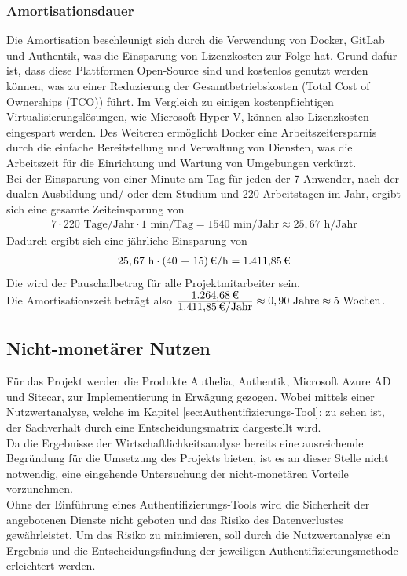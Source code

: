 \subsubsection{Amortisationsdauer}
\label{sec:Amortisationsdauer}
Die Amortisation beschleunigt sich durch die Verwendung von Docker, GitLab und Authentik, was die Einsparung von Lizenzkosten zur Folge hat. 
Grund dafür ist, dass diese Plattformen Open-Source sind und kostenlos genutzt werden können, was zu einer Reduzierung der  
Gesamtbetriebskosten (Total Cost of Ownerships (TCO)) führt. 
Im Vergleich zu einigen kostenpflichtigen Virtualisierungslösungen, wie \zB Microsoft Hyper-V, können also Lizenzkosten eingespart werden. 
Des Weiteren ermöglicht Docker eine Arbeitszeitersparnis durch die einfache Bereitstellung und Verwaltung von Diensten, was die Arbeitszeit für die 
Einrichtung und Wartung von Umgebungen verkürzt.
\\Bei der Einsparung von einer Minute am Tag für jeden der 7 Anwender, nach der dualen Ausbildung und/ oder dem Studium und 
220 Arbeitstagen im Jahr, ergibt sich eine gesamte Zeiteinsparung von 
\begin{eqnarray}
7 \cdot 220 \mbox{ Tage/Jahr} \cdot 1 \mbox{ min/Tag} = 1540 \mbox{ min/Jahr} \approx 25,67 \mbox{ h/Jahr} 
\end{eqnarray}
Dadurch ergibt sich eine jährliche Einsparung von 
\begin{eqnarray}
25,67 \mbox{ h} \cdot \eur{(40 + 15)}{\mbox{/h}} = \eur{1.411,85}
\end{eqnarray}
Die  wird der Pauschalbetrag für alle Projektmitarbeiter sein.
\\Die Amortisationszeit beträgt also $\frac{\eur{1.264,68}}{\eur{1.411,85}\mbox{/Jahr}} \approx 0,90 \mbox{ Jahre} \approx 5 \mbox{ Wochen}$.

\subsection{Nicht-monetärer Nutzen}
\label{sec:Nicht-monetärer Nutzen}
Für das Projekt werden die Produkte Authelia, Authentik, Microsoft Azure AD und Sitecar, zur Implementierung in Erwägung gezogen. 
Wobei mittels einer Nutzwertanalyse, welche im Kapitel \ref{sec:Authentifizierungs-Tool}:  zu sehen ist, der 
Sachverhalt durch eine Entscheidungsmatrix dargestellt wird.
\\Da die Ergebnisse der Wirtschaftlichkeitsanalyse bereits eine ausreichende Begründung für die Umsetzung des Projekts bieten, 
ist es an dieser Stelle nicht notwendig, eine eingehende Untersuchung der nicht-monetären Vorteile vorzunehmen.
\\Ohne der Einführung eines Authentifizierungs-Tools wird die Sicherheit der angebotenen Dienste nicht geboten und das Risiko des 
Datenverlustes gewährleistet. Um das Risiko zu minimieren, soll durch die Nutzwertanalyse ein Ergebnis und die Entscheidungsfindung 
der jeweiligen Authentifizierungsmethode erleichtert werden.


